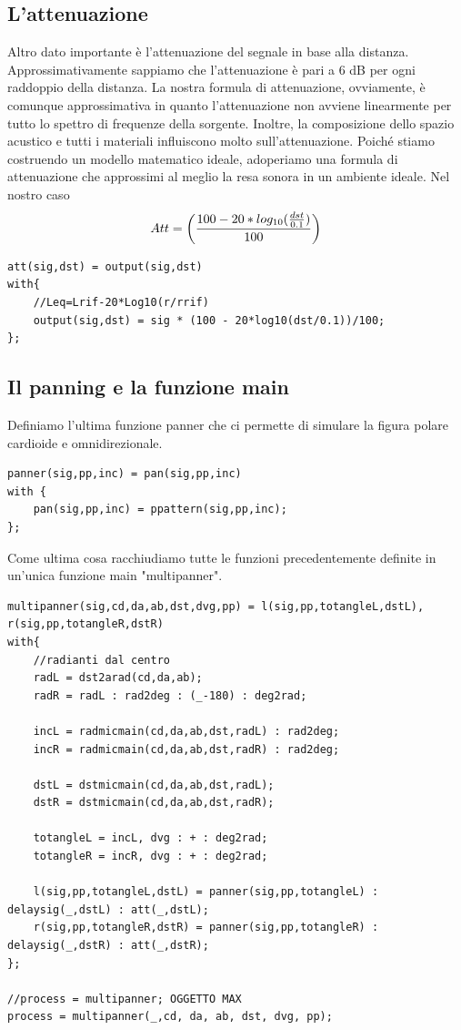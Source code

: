 \documentclass{article}
\begin{document}
\subsection{L'attenuazione}
    Altro dato importante è l'attenuazione del segnale in base alla distanza. Approssimativamente sappiamo che l'attenuazione è pari a 6 dB per ogni raddoppio della distanza. La nostra formula di attenuazione, ovviamente, è comunque approssimativa in quanto l'attenuazione non avviene linearmente per tutto lo spettro di frequenze della sorgente. Inoltre, la composizione dello spazio acustico e tutti i materiali influiscono molto sull'attenuazione. Poiché stiamo costruendo un modello matematico ideale, adoperiamo una formula di attenuazione che approssimi al meglio la resa sonora in un ambiente ideale. Nel nostro caso\\
    $$Att = \biggl({100 - 20*log_{10}(\frac{dst}{0.1})\over100} \biggr)$$
\begin{lstlisting}
att(sig,dst) = output(sig,dst)
with{
    //Leq=Lrif-20*Log10(r/rrif)
    output(sig,dst) = sig * (100 - 20*log10(dst/0.1))/100;
};
\end{lstlisting}

\subsection{Il panning e la funzione main}
Definiamo l'ultima funzione panner che ci permette di simulare la figura polare cardioide e omnidirezionale. 
\begin{lstlisting}
panner(sig,pp,inc) = pan(sig,pp,inc)
with {
    pan(sig,pp,inc) = ppattern(sig,pp,inc); 
};
\end{lstlisting}

Come ultima cosa racchiudiamo tutte le funzioni precedentemente definite in un'unica funzione main "multipanner".

\begin{lstlisting}
multipanner(sig,cd,da,ab,dst,dvg,pp) = l(sig,pp,totangleL,dstL), r(sig,pp,totangleR,dstR)
with{
    //radianti dal centro
    radL = dst2arad(cd,da,ab);
    radR = radL : rad2deg : (_-180) : deg2rad;

    incL = radmicmain(cd,da,ab,dst,radL) : rad2deg;
    incR = radmicmain(cd,da,ab,dst,radR) : rad2deg;

    dstL = dstmicmain(cd,da,ab,dst,radL);
    dstR = dstmicmain(cd,da,ab,dst,radR);

    totangleL = incL, dvg : + : deg2rad;
    totangleR = incR, dvg : + : deg2rad;

    l(sig,pp,totangleL,dstL) = panner(sig,pp,totangleL) : delaysig(_,dstL) : att(_,dstL);
    r(sig,pp,totangleR,dstR) = panner(sig,pp,totangleR) : delaysig(_,dstR) : att(_,dstR);
};

//process = multipanner; OGGETTO MAX
process = multipanner(_,cd, da, ab, dst, dvg, pp);
\end{lstlisting}
\end{document}
